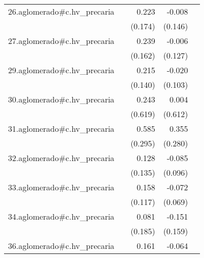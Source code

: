 {\begin{longtable}{l*{4}{D{.}{.}{-1}}}
\addlinespace
26.aglomerado#c.hv\_precaria&                     &       0.223         &      -0.008         &                     \\
            &                     &     (0.174)         &     (0.146)         &                     \\
\addlinespace
27.aglomerado#c.hv\_precaria&                     &       0.239         &      -0.006         &                     \\
            &                     &     (0.162)         &     (0.127)         &                     \\
\addlinespace
29.aglomerado#c.hv\_precaria&                     &       0.215         &      -0.020         &                     \\
            &                     &     (0.140)         &     (0.103)         &                     \\
\addlinespace
30.aglomerado#c.hv\_precaria&                     &       0.243         &       0.004         &                     \\
            &                     &     (0.619)         &     (0.612)         &                     \\
\addlinespace
31.aglomerado#c.hv\_precaria&                     &       0.585\sym{*}  &       0.355         &                     \\
            &                     &     (0.295)         &     (0.280)         &                     \\
\addlinespace
32.aglomerado#c.hv\_precaria&                     &       0.128         &      -0.085         &                     \\
            &                     &     (0.135)         &     (0.096)         &                     \\
\addlinespace
33.aglomerado#c.hv\_precaria&                     &       0.158         &      -0.072         &                     \\
            &                     &     (0.117)         &     (0.069)         &                     \\
\addlinespace
34.aglomerado#c.hv\_precaria&                     &       0.081         &      -0.151         &                     \\
            &                     &     (0.185)         &     (0.159)         &                     \\
\addlinespace
36.aglomerado#c.hv\_precaria&                     &       0.161         &      -0.064         &                     \\

\end{longtable}}
